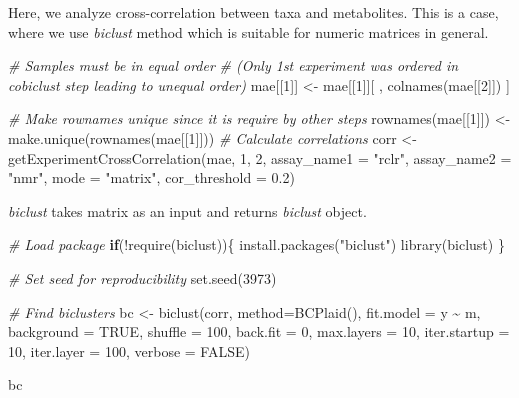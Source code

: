 \documentclass[
]{book}
\newenvironment{Shaded}{\begin{snugshade}}{\end{snugshade}}
\newcommand{\AttributeTok}[1]{\textcolor[rgb]{0.77,0.63,0.00}{#1}}
\newcommand{\CommentTok}[1]{\textcolor[rgb]{0.56,0.35,0.01}{\textit{#1}}}
\newcommand{\ConstantTok}[1]{\textcolor[rgb]{0.00,0.00,0.00}{#1}}
\newcommand{\ControlFlowTok}[1]{\textcolor[rgb]{0.13,0.29,0.53}{\textbf{#1}}}
\newcommand{\DecValTok}[1]{\textcolor[rgb]{0.00,0.00,0.81}{#1}}
\newcommand{\FloatTok}[1]{\textcolor[rgb]{0.00,0.00,0.81}{#1}}
\newcommand{\FunctionTok}[1]{\textcolor[rgb]{0.00,0.00,0.00}{#1}}
\newcommand{\NormalTok}[1]{#1}
\newcommand{\OtherTok}[1]{\textcolor[rgb]{0.56,0.35,0.01}{#1}}
\newcommand{\SpecialCharTok}[1]{\textcolor[rgb]{0.00,0.00,0.00}{#1}}
\newcommand{\StringTok}[1]{\textcolor[rgb]{0.31,0.60,0.02}{#1}}
\begin{document}
Here, we analyze cross-correlation between taxa and metabolites. This is a case, where
we use \emph{biclust} method which is suitable for numeric matrices in general.

\begin{Shaded}
\begin{Highlighting}[]
\CommentTok{\# Samples must be in equal order }
\CommentTok{\# (Only 1st experiment  was ordered in cobiclust step leading to unequal order)}
\NormalTok{mae[[}\DecValTok{1}\NormalTok{]] }\OtherTok{\textless{}{-}}\NormalTok{ mae[[}\DecValTok{1}\NormalTok{]][ , }\FunctionTok{colnames}\NormalTok{(mae[[}\DecValTok{2}\NormalTok{]]) ]}

\CommentTok{\# Make rownames unique since it is require by other steps}
\FunctionTok{rownames}\NormalTok{(mae[[}\DecValTok{1}\NormalTok{]]) }\OtherTok{\textless{}{-}} \FunctionTok{make.unique}\NormalTok{(}\FunctionTok{rownames}\NormalTok{(mae[[}\DecValTok{1}\NormalTok{]]))}
\CommentTok{\# Calculate correlations}
\NormalTok{corr }\OtherTok{\textless{}{-}} \FunctionTok{getExperimentCrossCorrelation}\NormalTok{(mae, }\DecValTok{1}\NormalTok{, }\DecValTok{2}\NormalTok{, }
                                      \AttributeTok{assay\_name1 =} \StringTok{"rclr"}\NormalTok{, }
                                      \AttributeTok{assay\_name2 =} \StringTok{"nmr"}\NormalTok{, }
                                      \AttributeTok{mode =} \StringTok{"matrix"}\NormalTok{, }
                                      \AttributeTok{cor\_threshold =} \FloatTok{0.2}\NormalTok{)}
\end{Highlighting}
\end{Shaded}

\emph{biclust} takes matrix as an input and returns \emph{biclust} object.

\begin{Shaded}
\begin{Highlighting}[]
\CommentTok{\# Load package}
\ControlFlowTok{if}\NormalTok{(}\SpecialCharTok{!}\FunctionTok{require}\NormalTok{(biclust))\{}
    \FunctionTok{install.packages}\NormalTok{(}\StringTok{"biclust"}\NormalTok{)}
    \FunctionTok{library}\NormalTok{(biclust)}
\NormalTok{\}}

\CommentTok{\# Set seed for reproducibility}
\FunctionTok{set.seed}\NormalTok{(}\DecValTok{3973}\NormalTok{)}

\CommentTok{\# Find biclusters}
\NormalTok{bc }\OtherTok{\textless{}{-}} \FunctionTok{biclust}\NormalTok{(corr, }\AttributeTok{method=}\FunctionTok{BCPlaid}\NormalTok{(), }\AttributeTok{fit.model =}\NormalTok{ y }\SpecialCharTok{\textasciitilde{}}\NormalTok{ m,}
              \AttributeTok{background =} \ConstantTok{TRUE}\NormalTok{, }\AttributeTok{shuffle =} \DecValTok{100}\NormalTok{, }\AttributeTok{back.fit =} \DecValTok{0}\NormalTok{, }\AttributeTok{max.layers =} \DecValTok{10}\NormalTok{,}
              \AttributeTok{iter.startup =} \DecValTok{10}\NormalTok{, }\AttributeTok{iter.layer =} \DecValTok{100}\NormalTok{, }\AttributeTok{verbose =} \ConstantTok{FALSE}\NormalTok{)}

\NormalTok{bc}
\end{Highlighting}
\end{Shaded}
\end{document}
